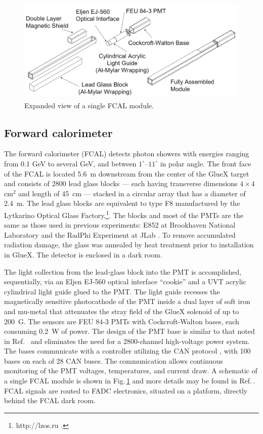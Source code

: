 \begin{figure}[tbp]\centering
\includegraphics[height=5cm]{figures/FCAL_single_module}
\caption{\label{fig:fcal:FCAL_single_module}
    Expanded view of a single FCAL module.
  }
\end{figure} 
\subsection{Forward calorimeter \label{sec:fcal}}
The forward calorimeter (FCAL) detects photon showers with energies ranging from 0.1 GeV to several GeV, and  between $1^{\circ}$--$11^{\circ}$ in polar angle. The front face of the FCAL is located 5.6~m downstream from the center of the GlueX target and consists of 2800 lead glass blocks --- each having transverse dimensions $4\times4$ cm$^2$ and length of 45~cm ---  stacked in a circular array that has a diameter of 2.4~m.  The lead glass blocks are equivalent to type F8 manufactured by the Lytkarino Optical Glass Factory,\footnote{http://lzos.ru .}. The blocks and most of the PMTs are the same as those used in previous experiments: E852 at Brookhaven National Laboratory \cite{CRITTENDEN1997377} and the RadPhi Experiment at JLab \cite{JONES2007384}. To remove accumulated radiation damage, the glass was annealed by heat treatment prior to installation in GlueX. The detector is enclosed in a dark room.

The light collection from the lead-glass block into the PMT is accomplished, sequentially, via an Eljen EJ-560 optical interface ``cookie'' and a UVT acrylic cylindrical light guide glued to the PMT. The light guide recesses the magnetically sensitive photocathode of the PMT inside a dual layer of soft iron and mu-metal that attenuates the stray field of the GlueX solenoid of up to 200~G. The sensors are FEU 84-3 PMTs with Cockcroft-Walton bases, each consuming 0.2~W of power.  The design of the PMT base is similar to that noted in Ref.~\cite{Brunner:1998fh} and eliminates the need for a 2800-channel high-voltage power system. The bases communicate with a controller utilizing the CAN protocol \cite{wiki:CANBus}, with 100 bases on each of 28 CAN buses.  The communication allows continuous monitoring of the PMT voltages, temperatures, and current draw.
A schematic of a single FCAL module is shown in 
Fig.\,\ref{fig:fcal:FCAL_single_module} and more details may be found in Ref.\,\cite{MORIYA201360}. FCAL signals are routed to FADC electronics, situated on a platform, directly behind the FCAL dark room.

